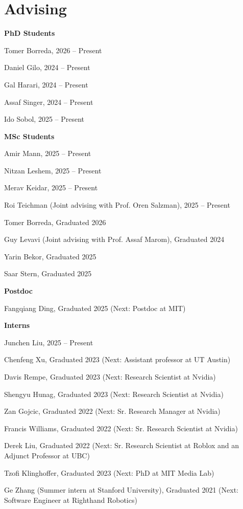 \section{\sc Advising}

{\bf PhD Students}
\begin{list2}
  \item Tomer Borreda, 2026 -- Present
  \item Daniel Gilo, 2024 -- Present
  \item Gal Harari, 2024 -- Present
  \item Assaf Singer, 2024 -- Present
  \item Ido Sobol, 2025 -- Present
\end{list2}
\vspace*{.05in}

{\bf MSc Students}
\begin{list2}
  \item Amir Mann, 2025 -- Present
  \item Nitzan Leshem, 2025 -- Present
  \item Merav Keidar, 2025 -- Present
  \item Roi Teichman (Joint advising with Prof. Oren Salzman), 2025 -- Present
  \item Tomer Borreda, Graduated 2026
  \item Guy Levavi (Joint advising with Prof. Assaf Marom), Graduated 2024
  \item Yarin Bekor, Graduated 2025
  \item Saar Stern, Graduated 2025
\end{list2}
\vspace*{.05in}

{\bf Postdoc}
\begin{list2}
  \item Fangqiang Ding, Graduated 2025 (Next: Postdoc at MIT)
\end{list2}
\vspace*{.05in}

{\bf Interns}
\begin{list2}
  \item Junchen Liu, 2025 -- Present
  \item Chenfeng Xu, Graduated 2023 (Next: Assistant professor at UT Austin)
  \item Davis Rempe, Graduated 2023 (Next: Research Scientist at Nvidia)
  \item Shengyu Hunag, Graduated 2023 (Next: Research Scientist at Nvidia)
  \item Zan Gojcic, Graduated 2022 (Next: Sr. Research Manager at Nvidia)
  \item Francis Williams, Graduated 2022 (Next: Sr. Research Scientist at Nvidia)
  \item Derek Liu, Graduated 2022 (Next: Sr. Research Scientist at Roblox and an Adjunct Professor at UBC)
  \item Tzofi Klinghoffer, Graduated 2023 (Next: PhD at MIT Media Lab)
  \item Ge Zhang (Summer intern at Stanford University), Graduated 2021 (Next: Software Engineer at Righthand Robotics)
\end{list2}
\vspace*{.05in}

